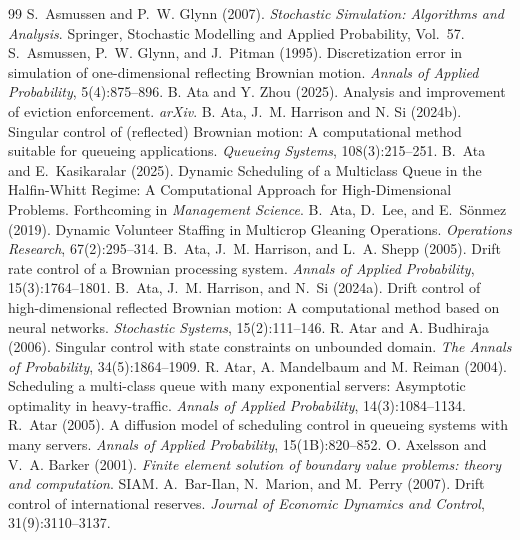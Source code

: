 \documentclass[11pt]{article}
\theoremstyle{definition}
\theoremstyle{plain}
\begin{document}
\begin{singlespace}
\begin{thebibliography}{99}
S.~Asmussen and P.~W. Glynn (2007).
\newblock \emph{Stochastic Simulation: Algorithms and Analysis}.
\newblock Springer, Stochastic Modelling and Applied Probability, Vol.~57.
S.~Asmussen, P.~W. Glynn, and J.~Pitman (1995).
\newblock Discretization error in simulation of one-dimensional reflecting Brownian motion.
\newblock \emph{Annals of Applied Probability}, 5(4):875--896.
   B. Ata and Y. Zhou (2025). \newblock Analysis and improvement of eviction enforcement. \newblock \emph{arXiv}. 
   B. Ata, J.~M. Harrison and N. Si (2024b). \newblock Singular control of (reflected) Brownian motion: A computational method suitable for queueing applications. 
  \newblock \emph{Queueing Systems}, 108(3):215--251.
   B.~Ata and E.~Kasikaralar (2025). \newblock Dynamic Scheduling of a Multiclass Queue in the Halfin-Whitt Regime: A Computational Approach for High-Dimensional Problems. \newblock Forthcoming in \emph{Management Science}.
   B.~Ata, D.~Lee, and E.~Sönmez (2019). \newblock Dynamic Volunteer Staffing in Multicrop Gleaning Operations. \newblock \emph{Operations Research}, 67(2):295--314.
   B.~Ata, J.~M. Harrison, and L.~A. Shepp (2005). \newblock Drift rate control of a Brownian processing system. \newblock \emph{Annals of Applied Probability}, 15(3):1764--1801.
   B.~Ata, J.~M. Harrison, and N.~Si (2024a). \newblock Drift control of high-dimensional reflected Brownian motion: A computational method based on neural networks. \newblock \emph{Stochastic Systems}, 15(2):111--146. %
   R. Atar and A. Budhiraja (2006). \newblock Singular control with state constraints on unbounded domain. 
  \newblock \emph{The Annals of Probability}, 34(5):1864--1909.
   R. Atar, A. Mandelbaum and M. Reiman (2004). \newblock Scheduling a multi-class queue with many exponential servers: Asymptotic optimality in heavy-traffic. 
  \newblock \emph{Annals of Applied Probability}, 14(3):1084--1134.
   R.~Atar (2005). \newblock A diffusion model of scheduling control in queueing systems with many servers. \newblock \emph{Annals of Applied Probability}, 15(1B):820--852.
   O. Axelsson and V.~A. Barker (2001). \newblock \emph{Finite element solution of boundary value problems: theory and computation}. \newblock SIAM.
   A.~Bar-Ilan, N.~Marion, and M.~Perry (2007). \newblock Drift control of international reserves. \newblock \emph{Journal of Economic Dynamics and Control}, 31(9):3110--3137.

\end{thebibliography}
\end{singlespace}
\end{document}
